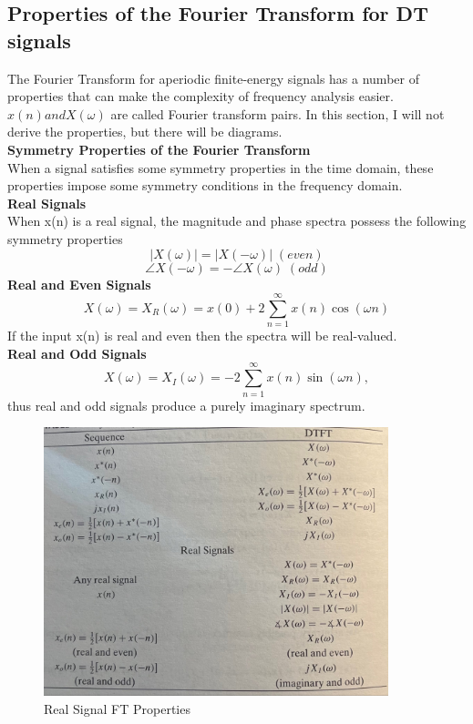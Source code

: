 \documentclass{article} %
\begin{document}
	\subsection{Properties of the Fourier Transform for DT signals}
	The Fourier Transform for aperiodic finite-energy signals has a number of properties that can make the complexity of frequency
	analysis easier. $x(n) and X(\omega)$ are called Fourier transform pairs. In this section, I will not derive the properties, but
	there will be diagrams. \\
	\textbf{Symmetry Properties of the Fourier Transform}\\
	When a signal satisfies some symmetry properties in the time domain, these properties impose some symmetry conditions in the frequency
	domain.\\
	\textbf{Real Signals}\\
	When x(n) is a real signal, the magnitude and phase spectra possess the following symmetry properties
	\begin{equation}
	|X(\omega)| = |X(-\omega)| \; (even)
	\end{equation}
	\begin{equation}
	\angle X(-\omega) = - \angle X(\omega) \;(odd)
	\end{equation}
	\textbf{Real and Even Signals}
	\begin{equation}
	X(\omega) = X_R(\omega) = x(0) + 2\sum_{n=1}^{\infty}x(n) \cos(\omega n)
	\end{equation} 
	If the input x(n) is real and even then the spectra will be real-valued.\\
	\textbf{Real and Odd Signals}
	\begin{equation}
	X(\omega) = X_I(\omega) = -2\sum_{n=1}^{\infty}x(n) \sin(\omega n), 
	\end{equation}
	thus real and odd signals produce a purely imaginary spectrum. 
	\begin{figure}[h]
	\centering
	\includegraphics[width=10cm]{real}
	\caption{Real Signal FT Properties}
	\end{figure}
\end{document}
